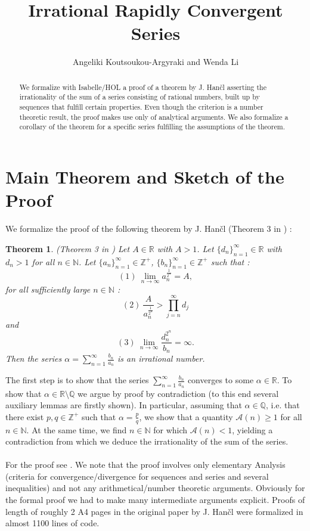 \documentclass[11pt,a4paper]{article}
\newtheorem{theorem}{Theorem}%
\begin{document}
\title{Irrational Rapidly Convergent Series}
\author{Angeliki Koutsoukou-Argyraki and Wenda Li}
\maketitle

\begin{abstract}
We formalize with Isabelle/HOL a proof of a theorem by J. Han\v cl asserting the irrationality of the sum of a series
consisting of rational numbers, built up by sequences that fulfill certain properties.
Even though the criterion is a number theoretic result, the proof makes use only of analytical arguments. 
We also formalize a corollary of the theorem for a specific series fulfilling the assumptions of the theorem.
\end{abstract}

\tableofcontents

\section{Main Theorem and Sketch of the Proof}
We formalize the proof of the following theorem by J. Han\v cl (Theorem 3 in \cite{hancl}) :
\begin{theorem}(Theorem 3  in \cite{hancl})
	Let  $A \in \mathbb{R}$ with $A>1$. Let $\{d_n \}^{\infty}_{n=1}  \in \mathbb{R}$ with $d_n >1$ for all $n \in \mathbb{N}$. Let $\{a_n \}^{\infty}_{n=1}  \in \mathbb{Z}^+$,
	$\{b_n \}^{\infty}_{n=1}  \in \mathbb{Z}^+$ such that :
	$$(1)~\lim_{n \rightarrow \infty} a_n^{\frac{1}{2^n}} = A , $$
	for all sufficiently  large $n \in \mathbb{N}$ :
	$$(2)~\frac{A}{ a_n^{\frac{1}{2^n}}    }  > \prod^{\infty}_{j=n} d_j$$
	and
	$$(3)~\lim_{n \rightarrow \infty}\frac{d_n^{2^n}}{b_n} =\infty.  $$
	Then the series $\alpha = \sum^{\infty}_{n=1} \frac{b_n}{a_n}$ is an irrational number.
\end{theorem}

The first step is to show that the series $ \sum^{\infty}_{n=1} \frac{b_n}{a_n}$ converges to some $\alpha \in \mathbb{R}$.
To show that $\alpha \in  \mathbb{R} \setminus \mathbb{Q}$ we argue by proof by contradiction (to this end several auxiliary lemmas are firstly shown).
In particular, assuming that $\alpha \in \mathbb{Q}$, i.e. that there exist $p, q \in \mathbb{Z}^+$ such that $\alpha = \frac{p}{q}$, we show that
a quantity $\mathcal{A}(n) \geq 1$ for all $n \in \mathbb{N}$.
At the same time, we find $n \in \mathbb{N}$ for which  $\mathcal{A}(n) < 1$, yielding a contradiction from which we deduce the irrationality of the sum of the series.
\\ \\
For the proof see \cite{hancl}. We note that the proof involves only elementary Analysis (criteria for convergence/divergence for sequences and series and several inequalities)
and not any arithmetical/number theoretic arguments. Obviously for the formal proof we had to make many intermediate arguments explicit.  Proofs of length of roughly 2 A4 pages
in the original paper by J. Han\v cl  were formalized in almost 1100 lines of code.
\end{document}

